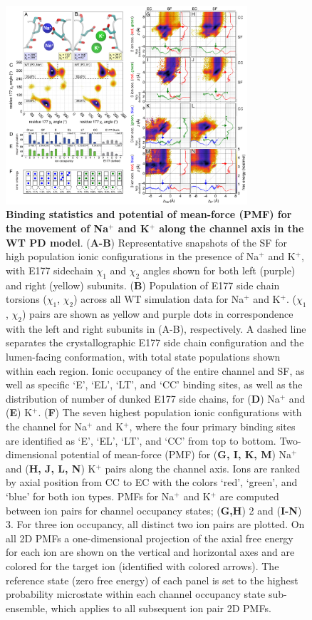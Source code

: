 \begin{refsection}
\begin{figure}[!ptb]
\centering
\includegraphics[width=0.8\textwidth]{nav6/Nav6FigS2}
\caption[Binding statistics and potential of mean-force (PMF) for the movement of Na$^+$ and K$^+$ along the channel axis in the WT PD model]{\textbf{Binding statistics and potential of mean-force (PMF) for the movement of Na$^+$ and K$^+$ along the channel axis in the WT PD model}. (\textbf{A-B}) Representative snapshots of the SF for high population ionic configurations in the presence of Na$^+$ and K$^+$, with E177 sidechain $\chi_1$ and $\chi_2$ angles shown for both left (purple) and right (yellow) subunits. (\textbf{B}) Population of E177 side chain torsions ($\chi_1$, $\chi_2$) across all WT simulation data for Na$^+$ and K$^+$. ($\chi_1$, $\chi_2$) pairs are shown as yellow and purple dots in correspondence with the left and right subunits in (A-B), respectively. A dashed line separates the crystallographic E177 side chain configuration and the lumen-facing conformation, with total state populations shown within each region. Ionic occupancy of the entire channel and SF, as well as specific `E', `EL', `LT', and `CC' binding sites, as well as the distribution of number of dunked E177 side chains, for (\textbf{D}) Na$^+$ and (\textbf{E}) K$^+$. (\textbf{F}) The seven highest population ionic configurations with the channel for Na$^+$ and K$^+$, where the four primary binding sites are identified as `E', `EL', `LT', and `CC' from top to bottom. Two-dimensional potential of mean-force (PMF) for (\textbf{G, I, K, M}) Na$^+$ and (\textbf{H, J, L, N}) K$^+$ pairs along the channel axis. Ions are ranked by axial position from CC to EC with the colors `red', `green', and `blue' for both ion types. PMFs for Na$^+$ and K$^+$ are computed between ion pairs for channel occupancy states; (\textbf{G,H}) 2 and (\textbf{I-N}) 3. For three ion occupancy, all distinct two ion pairs are plotted. On all 2D PMFs a one-dimensional projection of the axial free energy for each ion are shown on the vertical and horizontal axes and are colored for the target ion (identified with colored arrows). The reference state (zero free energy) of each panel is set to the highest probability microstate within each channel occupancy state sub-ensemble, which applies to all subsequent ion pair 2D PMFs.}
\label{fig:nav6figS2}
\end{figure}


\end{refsection}
